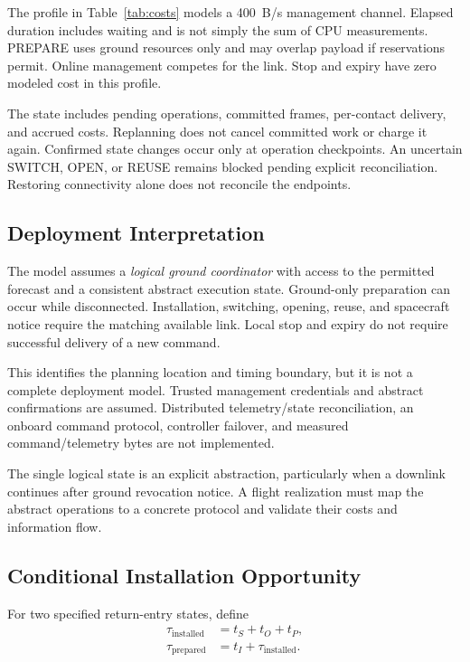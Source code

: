 \documentclass[conference]{IEEEtran}
\begin{document}
The profile in Table~\ref{tab:costs} models a 400~B/s
management channel.
Elapsed duration includes waiting and is not simply the
sum of CPU measurements.
PREPARE uses ground resources only and may overlap payload
if reservations permit.
Online management competes for the link.
Stop and expiry have zero modeled cost in this profile.

The state includes pending operations, committed frames,
per-contact delivery, and accrued costs.
Replanning does not cancel committed work or charge it again.
Confirmed state changes occur only at operation checkpoints.
An uncertain SWITCH, OPEN, or REUSE remains blocked pending
explicit reconciliation.
Restoring connectivity alone does not reconcile the endpoints.

\subsection{Deployment Interpretation}

The model assumes a \emph{logical ground coordinator}
with access to the permitted forecast and a consistent abstract
execution state.
Ground-only preparation can occur while disconnected.
Installation, switching, opening, reuse, and spacecraft notice
require the matching available link.
Local stop and expiry do not require successful delivery
of a new command.

This identifies the planning location and timing boundary,
but it is not a complete deployment model.
Trusted management credentials and abstract confirmations
are assumed.
Distributed telemetry/state reconciliation, an onboard command
protocol, controller failover, and measured command/telemetry
bytes are not implemented.

The single logical state is an explicit abstraction,
particularly when a downlink continues after ground
revocation notice.
A flight realization must map the abstract operations to a
concrete protocol and validate their costs and information flow.

\subsection{Conditional Installation Opportunity}
\label{sec:opportunity}

For two specified return-entry states, define
\begin{align}
    \tau_{\mathrm{installed}}
        &=t_S+t_O+t_P,
        \label{eq:installed-chain}\\
    \tau_{\mathrm{prepared}}
        &=t_I+\tau_{\mathrm{installed}}.
        \label{eq:prepared-chain}
\end{align}
\end{document}
